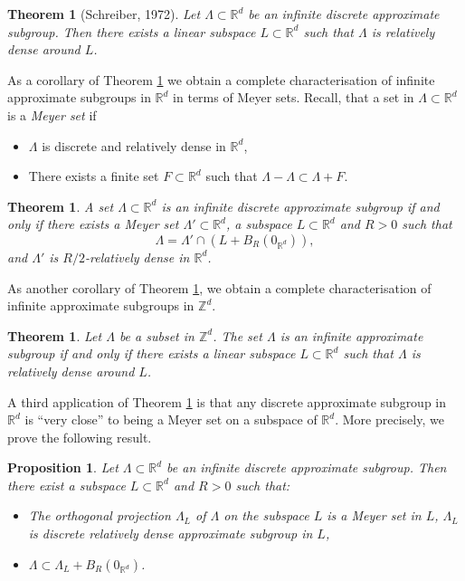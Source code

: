 \documentclass[JEP,XML,SOM,Unicode,NoEqCountersInSection]{cedram}
\newcommand{\bR}{\mathbb{R}}
\newcommand{\bZ}{\mathbb{Z}}
\newcounter{dummy} \numberwithin{dummy}{section}
\theoremstyle{plain}
\newtheorem{prop}[dummy]{Proposition}
\newtheorem{thm}[dummy]{Theorem}
\theoremstyle{definition}
\begin{document}
\begin{thm}[Schreiber, 1972]\label{main-thm}
Let $\Lambda \subset \bR^d$ be an infinite discrete approximate subgroup. Then there exists a linear subspace $L \subset \bR^d$ such that $\Lambda$ is relatively dense around $L$.
\end{thm}

As a corollary of Theorem \ref{main-thm} we obtain a complete characterisation of infinite approximate subgroups in $\bR^d$ in terms of Meyer sets. Recall, that a set in $\Lambda \subset \bR^d$ is a \textit{Meyer set} if
\begin{itemize}
\item $\Lambda$ is discrete and relatively dense in $\bR^d$,
\item There exists a finite set $F \subset \bR^d$ such that $\Lambda - \Lambda \subset \Lambda + F$.
\end{itemize}

\begin{thm}\label{complete-classification}
A set $\Lambda \subset \bR^d$ is an infinite discrete approximate subgroup if and only if there exists a Meyer set $\Lambda' \subset \bR^d$, a subspace $L \subset \bR^d$ and $R > 0$ such that\vspace*{-3pt}
\[
\Lambda = \Lambda' \cap \left( L + B_R(0_{\bR^d})\right),
\]
and $\Lambda'$ is $R/2$-relatively dense in $\bR^d$.

\end{thm}
As another corollary of Theorem \ref{main-thm}, we obtain a complete characterisation of infinite approximate subgroups in $\bZ^d$.

\begin{thm}\label{cor}
Let $\Lambda$ be a subset in $\bZ^d$. The set $\Lambda$ is an infinite approximate subgroup if and only if there exists a linear subspace $L \subset \bR^d$ such that $\Lambda$ is relatively dense around $L$.
\end{thm}

A third application of Theorem \ref{main-thm} is that any discrete approximate subgroup in~$\bR^d$ is ``very close'' to being a Meyer set on a subspace of $\bR^d$. More precisely, we prove the following result.

\begin{prop}\label{meyer}
Let $\Lambda \subset \bR^d$ be an infinite discrete approximate subgroup. Then there exist a subspace $L \subset \bR^d$ and $R > 0$ such that:
\begin{itemize}
\item The orthogonal projection $\Lambda_L$ of $\Lambda$ on the subspace $L$ is a Meyer set in $L$, \ie $\Lambda_L$ is discrete relatively dense approximate subgroup in $L$,
\item $\Lambda \subset \Lambda_L + B_R(0_{\bR^d})$.
\end{itemize}
\end{prop}
\end{document}
